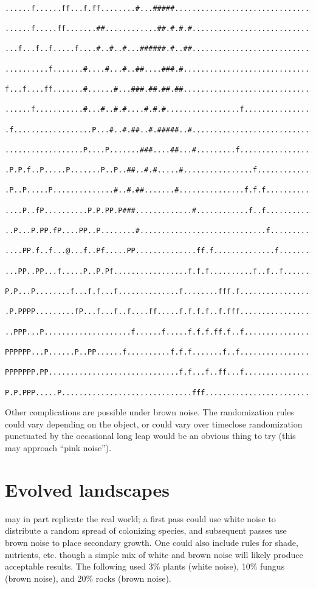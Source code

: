 \documentclass[12pt,a4paper]{article}
\begin{document}
\begin{verbatim}
  ......f......ff...f.ff........#...#####.................................
  ......f.....ff.......##............##.#.#.#.............................
  ...f...f..f.....f....#..#..#...######.#..##.............................
  ..........f.......#....#...#..##....###.#...............................
  f...f....ff.......#......#...###.##.##.##...............................
  ......f...........#...#..#.#....#.#.#.................f.................
  .f..................P...#..#.##..#.#####..#.............................
  ..................P....P.......###....##...#.........f..................
  .P.P.f..P.....P.......P..P..##..#.#.....#................f..............
  .P..P.....P..............#..#.##.......#...............f.f.f............
  ....P..fP..........P.P.PP.P###.............#............f..f............
  ..P...P.PP.fP....PP..P........#.............................f...........
  ....PP.f..f...@...f..Pf.....PP..............ff.f..............f.........
  ...PP..PP...f.....P..P.Pf.................f.f.f..........f..f..f........
  P.P...P........f...f.f...f..............f........fff.f..................
  .P.PPPP.........fP...f...f..f....ff.....f.f.f.f..f.fff..................
  ..PPP...P....................f......f.....f.f.f.ff.f..f.................
  PPPPPP...P......P..PP......f..........f.f.f.......f..f..................
  PPPPPPP.PP..............................f.f...f..ff...f.................
  P.P.PPP.....P..............................fff..........................
\end{verbatim}

Other complications are possible under brown noise. The
randomization rules could vary depending on the object, or could
vary over time\textendash close randomization punctuated by the
occasional long leap would be an obvious thing to try (this may
approach ``pink noise'').

\section*{Evolved landscapes}

may in part replicate the real world; a first pass could use white
noise to distribute a random spread of colonizing species, and
subsequent passes use brown noise to place secondary growth. One could
also include rules for shade, nutrients, etc. though a simple mix of
white and brown noise will likely produce acceptable results. The
following used 3\% plants (white noise), 10\% fungus (brown noise), and
20\% rocks (brown noise).
\end{document}
